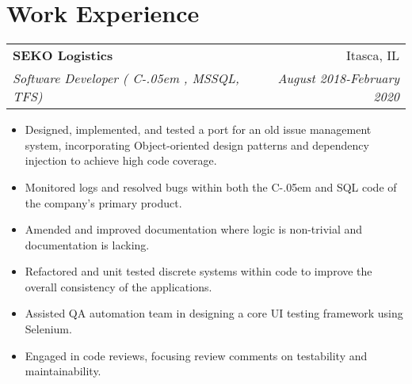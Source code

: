 \documentclass[letterpaper,11pt]{article}
\makeatletter
\newcommand{\resumeItem}[2]{
    \vspace{-2pt}
    \item\small{
        \textbf{#1}{ #2 \vspace{-2pt}}
    }
}
\newcommand{\resumeSubheading}[4]{
        \begin{tabular*}{0.97\textwidth}{l@{\extracolsep{\fill}}r}
            \textbf{#1} & #2 \\
            \textit{\small#3} & \textit{\small #4} \\
        \end{tabular*}
}
\newcommand{\resumeSubHeadingListStart}{}
\newcommand{\resumeSubHeadingListEnd}{}
\newcommand{\resumeItemListStart}{\begin{itemize}}
\newcommand{\resumeItemListEnd}{\end{itemize}}
\newcommand{\Csharp}{%
  {\settoheight{\dimen0}{C}C\kern-.05em \resizebox{!}{\dimen0}{\raisebox{\depth}{\#}}}}
\makeatother
\begin{document}
\section{\textbf{Work Experience}}
    \resumeSubHeadingListStart
        \resumeSubheading
            {SEKO Logistics}{Itasca, IL}
            {Software Developer (\Csharp, MSSQL, TFS)}{August 2018-February 2020}
            \resumeItemListStart
                \resumeItem{}
                    {
                        Designed, implemented, and tested a port for
                        an old issue management system, incorporating Object-oriented
                        design patterns and dependency injection to achieve high code coverage.
                    }
                \resumeItem{}
                    {
                        Monitored logs and resolved bugs within both the
                        \Csharp \space and SQL code of the company's primary product.
                    }
                \resumeItem{}
                    {
                        Amended and improved documentation where logic
                        is non-trivial and documentation is lacking.
                    }
                \resumeItem{}
                    {
                        Refactored and unit tested discrete systems
                        within code to improve the overall consistency
                        of the applications.
                    }
                \resumeItem{}
                    {
                        Assisted QA automation team in designing a core UI testing framework using Selenium.
                    }
                \resumeItem{}
                    {
                        Engaged in code reviews,
                        focusing review comments on testability and maintainability.
                    }
            \resumeItemListEnd
    \resumeSubHeadingListEnd
\end{document}
